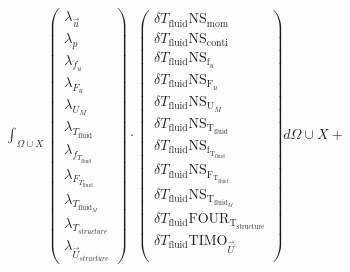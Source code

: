 \documentclass[10pt]{article} %
\begin{document}
\begin{center}
	$\int_{\Omega \cup X}
	\begin{pmatrix}
		\lambda_{\vec{u}} \\ \lambda_p \\ \lambda_{f_u} \\ \lambda_{F_u} \\ \lambda_{U_M}\\ \lambda_{T_{\text{fluid}}} \\ \lambda_{f_{T_{\text{fluid}}}} \\ \lambda_{F_{T_{\text{fluid}}}} \\ \lambda_{T_{\text{fluid}_M}} \\ \lambda_{T_{structure}} \\ \lambda_{\vec{U}_{structure}}
	\end{pmatrix}
	\cdot
	\begin{pmatrix}
		\delta T_{\text{fluid}} \text{NS}_{\text{mom}} \\
		\delta T_{\text{fluid}} \text{NS}_{\text{conti}}\\
		\delta T_{\text{fluid}} \text{NS}_{\text{f}_u} \\
		\delta T_{\text{fluid}} \text{NS}_{\text{F}_u} \\
		\delta T_{\text{fluid}} \text{NS}_{\text{U}_M} \\
		\delta T_{\text{fluid}} \text{NS}_{\text{T}_{\text{fluid}}} \\
		\delta T_{\text{fluid}} \text{NS}_{\text{f}_{\text{T}_{\text{fluid}}}}\\
		\delta T_{\text{fluid}} \text{NS}_{\text{F}_{\text{T}_{\text{fluid}}}}\\
		\delta T_{\text{fluid}} \text{NS}_{\text{T}_{\text{fluid}_M}}\\
		\delta T_{\text{fluid}} \text{FOUR}_{\text{T}_{\text{structure}}}\\
		\delta T_{\text{fluid}} \text{TIMO}_{\vec{U}}\\
	\end{pmatrix}
	d\Omega \cup X + $\\


\end{center}
\end{document}
